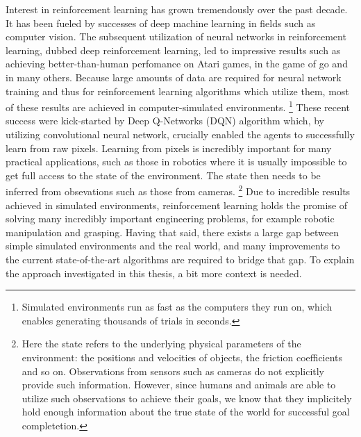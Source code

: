 Interest in reinforcement learning has grown tremendously over the past decade.
It has been fueled by successes of deep machine learning in fields such as computer vision.
The subsequent utilization of neural networks in reinforcement learning,
dubbed deep reinforcement learning,
led to impressive results such as achieving better-than-human
perfomance on Atari games, in the game of go and in many others.
Because large amounts of data are required for neural network training
and thus for reinforcement learning algorithms which utilize them,
most of these results are achieved in computer-simulated environments.
\footnote{Simulated environments run as fast as the computers they run on,
		which enables generating thousands of trials in seconds.}
These recent success were kick-started by Deep Q-Networks (DQN) algorithm which,
by utilizing convolutional neural network, crucially enabled the agents to successfully learn from raw pixels.
Learning from pixels is incredibly important for many practical applications,
such as those in robotics
where it is usually impossible to get full access to the state of the environment.
The state then needs to be inferred from obsevations such as those from cameras.
\footnote{Here the state refers to the underlying physical parameters of the environment:
the positions and velocities of objects, the friction coefficients and so on.
Observations from sensors such as cameras do not explicitly provide such information.
However, since humans and animals are able to utilize such observations to achieve their
goals, we know that they implicitely hold enough information about the true state
of the world for successful goal completetion.}
Due to incredible results achieved in simulated environments,
reinforcement learning holds the promise of solving
many incredibly important engineering problems, for example robotic manipulation
and grasping.
Having that said, there exists a large gap between simple simulated environments and
the real world,
and many improvements to the current state-of-the-art algorithms are required to
bridge that gap.
To explain the approach investigated in this thesis,
a bit more context is needed.


